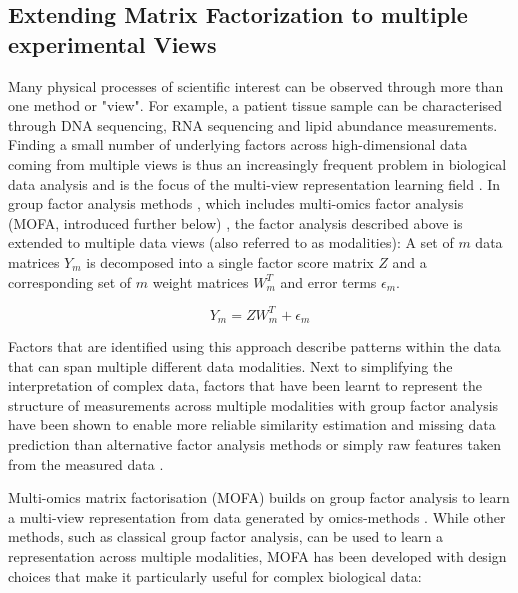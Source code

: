 \begin{flushleft}
\subsection{Extending Matrix Factorization to multiple experimental Views}

Many physical processes of scientific interest can be observed through more than one method or "view". For example, a patient tissue sample can be characterised through DNA sequencing, RNA sequencing and lipid abundance measurements. Finding a small number of underlying factors across high-dimensional data coming from multiple views is thus an increasingly frequent problem in biological data analysis and is the focus of the multi-view representation learning field \citep{liSurveyMultiViewRepresentation2019}. In group factor analysis methods \citep{virtanenBayesianGroupFactor2012, klamiGroupFactorAnalysis2014}, which includes multi-omics factor analysis (MOFA, introduced further below) \citep{argelaguetMultiOmicsFactorAnalysis2018b, argelaguetMOFAStatisticalFramework2020a}, the factor analysis described above is extended to multiple data views (also referred to as modalities): A set of \(m\) data matrices \( Y_m \) is decomposed into a single factor score matrix \( Z \) and a corresponding set of \(m\) weight matrices \( W_m^T \) and error terms \(\epsilon_m\). 

\begin{equation}
    Y_m = ZW_m^T + \epsilon_m
\end{equation}

Factors that are identified using this approach describe patterns within the data that can span multiple different data modalities. Next to simplifying the interpretation of complex data, factors that have been learnt to represent the structure of measurements across multiple modalities with group factor analysis have been shown to enable more reliable similarity estimation and missing data prediction than alternative factor analysis methods or simply raw features taken from the measured data \citep{klamiGroupFactorAnalysis2014}.
\par

Multi-omics matrix factorisation (MOFA) builds on group factor analysis to learn a multi-view representation from data generated by omics-methods \citep{argelaguetMultiOmicsFactorAnalysis2018b, argelaguetMOFAStatisticalFramework2020a}. While other methods, such as classical group factor analysis, can be used to learn a representation across multiple modalities, MOFA has been developed with design choices that make it particularly useful for complex biological data:


\end{flushleft}
